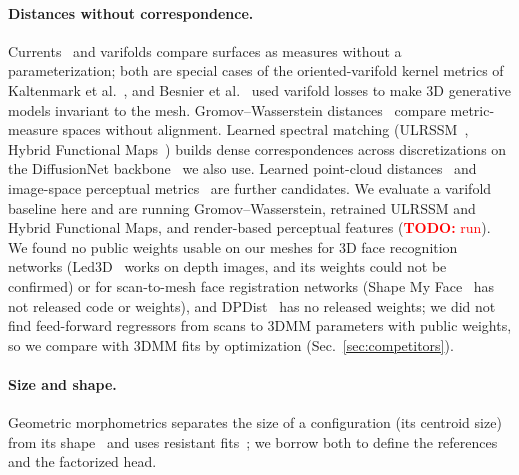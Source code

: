 \documentclass[10pt,twocolumn,letterpaper]{article}
\newcommand{\todo}[1]{\textcolor{red}{\textbf{TODO:} #1}}
\begin{document}
\paragraph{Distances without correspondence.} Currents~\cite{vaillant2005surface} and varifolds compare surfaces as measures without a parameterization; both are special cases of the oriented-varifold kernel metrics of Kaltenmark et al.~\cite{kaltenmark2017general}, and Besnier et al.~\cite{besnier2023meshinvariant} used varifold losses to make 3D generative models invariant to the mesh. Gromov--Wasserstein distances~\cite{memoli2011gw} compare metric-measure spaces without alignment. Learned spectral matching (ULRSSM~\cite{cao2023ulrssm}, Hybrid Functional Maps~\cite{bastian2024hybrid}) builds dense correspondences across discretizations on the DiffusionNet backbone~\cite{diffusionet} we also use. Learned point-cloud distances~\cite{urbach2020dpdist} and image-space perceptual metrics~\cite{lpips,fu2023dreamsim,oquab2023dinov2,radford2021clip} are further candidates. We evaluate a varifold baseline here and are running Gromov--Wasserstein, retrained ULRSSM and Hybrid Functional Maps, and render-based perceptual features (\todo{run}). We found no public weights usable on our meshes for 3D face recognition networks (Led3D~\cite{mu2019led3d} works on depth images, and its weights could not be confirmed) or for scan-to-mesh face registration networks (Shape My Face~\cite{bahri2021smf} has not released code or weights), and DPDist~\cite{urbach2020dpdist} has no released weights; we did not find feed-forward regressors from scans to 3DMM parameters with public weights, so we compare with 3DMM fits by optimization (Sec.~\ref{sec:competitors}).

\paragraph{Size and shape.} Geometric morphometrics separates the size of a configuration (its centroid size) from its shape~\cite{kendall1984shape,dryden2016statistical} and uses resistant fits~\cite{siegel1982resistant}; we borrow both to define the references and the factorized head.
\end{document}

